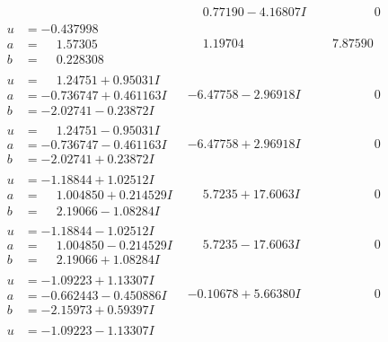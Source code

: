 \documentclass[1p]{elsarticle_modified}
\theoremstyle{definition}
\begin{document}
$$\begin{array}{c|c|c}
 & \phantom{-}0.77190 - 4.16807 I & \phantom{-0.000000 } 0 \\ \hline\begin{aligned}
u &= -0.437998\phantom{ +0.000000I} \\
a &= \phantom{-}1.57305\phantom{ +0.000000I} \\
b &= \phantom{-}0.228308\phantom{ +0.000000I}\end{aligned}
 & \phantom{-}1.19704\phantom{ +0.000000I} & \phantom{-}7.87590\phantom{ +0.000000I} \\ \hline\begin{aligned}
u &= \phantom{-}1.24751 + 0.95031 I \\
a &= -0.736747 + 0.461163 I \\
b &= -2.02741 - 0.23872 I\end{aligned}
 & -6.47758 - 2.96918 I & \phantom{-0.000000 } 0 \\ \hline\begin{aligned}
u &= \phantom{-}1.24751 - 0.95031 I \\
a &= -0.736747 - 0.461163 I \\
b &= -2.02741 + 0.23872 I\end{aligned}
 & -6.47758 + 2.96918 I & \phantom{-0.000000 } 0 \\ \hline\begin{aligned}
u &= -1.18844 + 1.02512 I \\
a &= \phantom{-}1.004850 + 0.214529 I \\
b &= \phantom{-}2.19066 - 1.08284 I\end{aligned}
 & \phantom{-}5.7235 + 17.6063 I & \phantom{-0.000000 } 0 \\ \hline\begin{aligned}
u &= -1.18844 - 1.02512 I \\
a &= \phantom{-}1.004850 - 0.214529 I \\
b &= \phantom{-}2.19066 + 1.08284 I\end{aligned}
 & \phantom{-}5.7235 - 17.6063 I & \phantom{-0.000000 } 0 \\ \hline\begin{aligned}
u &= -1.09223 + 1.13307 I \\
a &= -0.662443 - 0.450886 I \\
b &= -2.15973 + 0.59397 I\end{aligned}
 & -0.10678 + 5.66380 I & \phantom{-0.000000 } 0 \\ \hline\begin{aligned}
u &= -1.09223 - 1.13307 I \\

\end{aligned}
\end{array}$$
\end{document}
